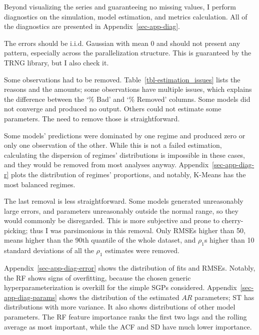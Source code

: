 \documentclass[
  letterpaper,
  DIV=11,
  numbers=noendperiod]{scrartcl}
\numberwithin{equation}{section}
\numberwithin{table}{section}
\numberwithin{figure}{section}
\begin{document}
Beyond visualizing the series and guaranteeing no missing values, I
perform diagnostics on the simulation, model estimation, and metrics
calculation. All of the diagnostics are presented in
Appendix~\ref{sec-app-diag}.

The errors should be i.i.d. Gaussian with mean \(0\) and should not
present any pattern, especially across the parallelization structure.
This is guaranteed by the TRNG library, but I also check it.

Some observations had to be removed. Table~\ref{tbl-estimation_issues}
lists the reasons and the amounts; some observations have multiple
issues, which explains the difference between the `\% Bad' and `\%
Removed' columns. Some models did not converge and produced no output.
Others could not estimate some parameters. The need to remove those is
straightforward.

Some models' predictions were dominated by one regime and produced zero
or only one observation of the other. While this is not a failed
estimation, calculating the dispersion of regimes' distributions is
impossible in these cases, and they would be removed from most analyses
anyway. Appendix~\ref{sec-app-diag-r} plots the distribution of regimes'
proportions, and notably, K-Means has the most balanced regimes.

The last removal is less straightforward. Some models generated
unreasonably large errors, and parameters unreasonably outside the
normal range, so they would commonly be disregarded. This is more
subjective and prone to cherry-picking; thus I was parsimonious in this
removal. Only RMSEs higher than 50, means higher than the 90th quantile
of the whole dataset, and \(\rho_1\)s higher than 10 standard deviations
of all the \(\rho_1\) estimates were removed.

Appendix~\ref{sec-app-diag-error} shows the distribution of fits and
RMSEs. Notably, the RF shows signs of overfitting, because the chosen
generic hyperparameterization is overkill for the simple SGPs
considered. Appendix~\ref{sec-app-diag-params} shows the distribution of
the estimated \(AR\) parameters; ST has distributions with more
variance. It also shows distributions of other model parameters. The RF
feature importance ranks the first two lags and the rolling average as
most important, while the ACF and SD have much lower importance.

\begin{table}[!htbp]

\caption{\label{tbl-estimation_issues}Estimation issues}

\centering{



}

\end{table}%
\end{document}
